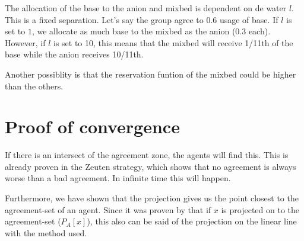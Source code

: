 The allocation of the base to the anion and mixbed is dependent on de water $l$. This is a fixed separation. Let's say the group agree to 0.6 usage of base. If $l$ is set to $1$, we allocate as much base to the mixbed as the anion (0.3 each). However, if $l$ is set to 10, this means that the mixbed will receive 1/11th of the base while the anion receives 10/11th. 

Another possiblity is that the reservation funtion of the mixbed could be higher than the others. 

 
\section{Proof of convergence}
If there is an intersect of the agreement zone, the agents will find this.
This is already proven in the Zeuten strategy, which shows that no agreement is always worse than a bad agreement. In infinite time this will happen. 

Furthermore, we have shown that the projection gives us the point closest to the agreement-set of an agent. Since it was proven by \citet{zheng2015automated} that if $x$ is projected on to the agreement-set  ($P_A[x]$), this also can be said of the projection on the linear line with the method used. 


%
%



